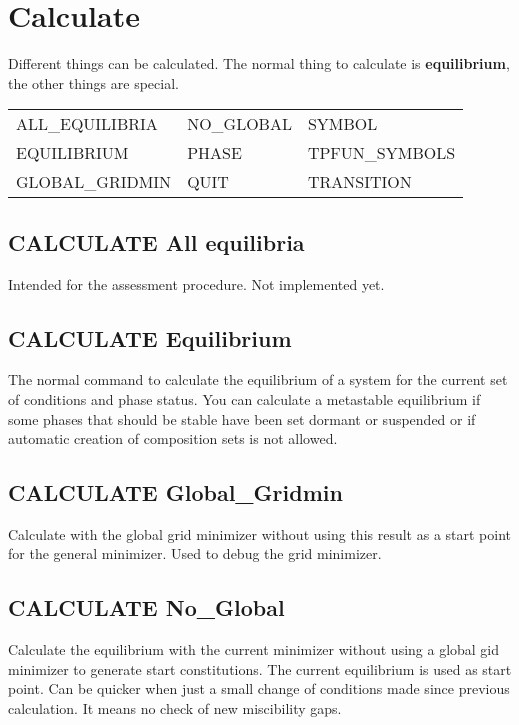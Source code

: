 \documentclass[12pt]{article}
\begin{document}
\section{Calculate }

Different things can be calculated.  The normal thing to calculate is
{\bf equilibrium}, the other things are special.

\begin{tabular}{lll}
 ALL\_EQUILIBRIA &  NO\_GLOBAL  &      SYMBOL\\
 EQUILIBRIUM    &  PHASE     &      TPFUN\_SYMBOLS\\
 GLOBAL\_GRIDMIN & QUIT       &     TRANSITION\\
\end{tabular}
\subsection{CALCULATE All equilibria}

Intended for the assessment procedure.  Not implemented yet.

\subsection{CALCULATE Equilibrium}

The normal command to calculate the equilibrium of a system for the
current set of conditions and phase status.  You can calculate a
metastable equilibrium if some phases that should be stable have been
set dormant or suspended or if automatic creation of composition sets
is not allowed.

\subsection{CALCULATE Global\_Gridmin}

Calculate with the global grid minimizer without using this result as a
start point for the general minimizer.  Used to debug the grid
minimizer.

\subsection{CALCULATE No\_Global}

Calculate the equilibrium with the current minimizer without using a
global gid minimizer to generate start constitutions.  The current
equilibrium is used as start point.  Can be quicker when just a small
change of conditions made since previous calculation.  It means no
check of new miscibility gaps.
\end{document}
